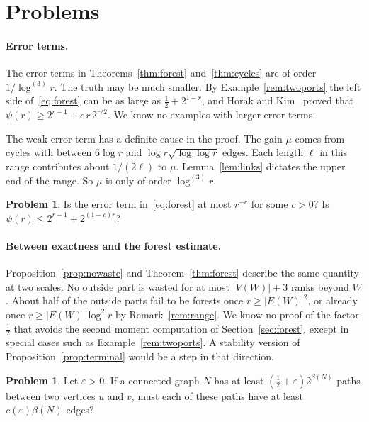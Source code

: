 \documentclass[11pt]{article}
\theoremstyle{definition}
\newtheorem{problem}[theorem]{Problem}
\theoremstyle{remark}
\newcommand{\lgk}[1]{\log^{(#1)}}
\newcommand{\half}{\tfrac12}
\numberwithin{equation}{section}
\begin{document}
\section{Problems}\label{sec:problems}

\paragraph{Error terms.}
The error terms in Theorems~\ref{thm:forest} and~\ref{thm:cycles} are of order $1/\lgk3r$. The
truth may be much smaller. By Example~\ref{rem:twoports} the left side of~\eqref{eq:forest} can be
as large as $\half+2^{1-r}$, and Horak and Kim~\cite{HK} proved that
$\psi(r)\ge2^{r-1}+c\,r\,2^{r/2}$. We know no examples with larger error terms.

The weak error term has a definite cause in the proof. The gain $\mu$ comes from cycles with between
$6\log r$ and $\log r\sqrt{\log\log r}$ edges. Each length $\ell$ in this range contributes about
$1/(2\ell)$ to $\mu$. Lemma~\ref{lem:links} dictates the upper end of the range. So $\mu$ is only of
order $\lgk3r$.

\begin{problem}
Is the error term in~\eqref{eq:forest} at most $r^{-c}$ for some $c>0$? Is
$\psi(r)\le2^{r-1}+2^{(1-c)r}$?
\end{problem}

\paragraph{Between exactness and the forest estimate.}
Proposition~\ref{prop:nowaste} and Theorem~\ref{thm:forest} describe the same quantity at two
scales. No outside part is wasted for at most $|V(W)|+3$ ranks beyond $W$. About half of the outside
parts fail to be forests once $r\ge|E(W)|^{2}$, or already once $r\ge|E(W)|\log^{2}r$ by
Remark~\ref{rem:range}. We know no proof of the factor $\half$ that avoids the second moment
computation of Section~\ref{sec:forest}, except in special cases such as
Example~\ref{rem:twoports}. A stability version of Proposition~\ref{prop:terminal} would be a step
in that direction.

\begin{problem}
Let $\varepsilon>0$. If a connected graph $N$ has at least $(\half+\varepsilon)2^{\beta(N)}$ paths
between two vertices $u$ and $v$, must each of these paths have at least $c(\varepsilon)\beta(N)$
edges?
\end{problem}
\end{document}
